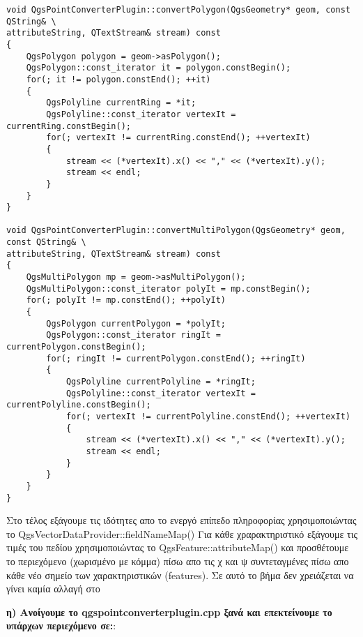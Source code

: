 \begin{verbatim}
void QgsPointConverterPlugin::convertPolygon(QgsGeometry* geom, const QString& \
attributeString, QTextStream& stream) const
{
    QgsPolygon polygon = geom->asPolygon();
    QgsPolygon::const_iterator it = polygon.constBegin();
    for(; it != polygon.constEnd(); ++it)
    {
        QgsPolyline currentRing = *it;
        QgsPolyline::const_iterator vertexIt = currentRing.constBegin();
        for(; vertexIt != currentRing.constEnd(); ++vertexIt)
        {
            stream << (*vertexIt).x() << "," << (*vertexIt).y();
            stream << endl;
        }
    }
}

void QgsPointConverterPlugin::convertMultiPolygon(QgsGeometry* geom, const QString& \
attributeString, QTextStream& stream) const
{
    QgsMultiPolygon mp = geom->asMultiPolygon();
    QgsMultiPolygon::const_iterator polyIt = mp.constBegin();
    for(; polyIt != mp.constEnd(); ++polyIt)
    {
        QgsPolygon currentPolygon = *polyIt;
        QgsPolygon::const_iterator ringIt = currentPolygon.constBegin();
        for(; ringIt != currentPolygon.constEnd(); ++ringIt)
        {
            QgsPolyline currentPolyline = *ringIt;
            QgsPolyline::const_iterator vertexIt = currentPolyline.constBegin();
            for(; vertexIt != currentPolyline.constEnd(); ++vertexIt)
            {
                stream << (*vertexIt).x() << "," << (*vertexIt).y();
                stream << endl;
            }
        }
    }
}
\end{verbatim}


Στο τέλος εξάγουμε τις ιδότητες απο το ενεργό επίπεδο πληροφορίας χρησιμοποιώντας το QgsVectorDataProvider::fieldNameMap() Για κάθε χραρακτηριστικό εξάγουμε τις τιμές του πεδίου χρησιμοποιώντας το QgsFeature::attributeMap() και προσθέτουμε το περιεχόμενο (χωρισμένο με κόμμα) πίσω απο τις χ και ψ συντεταγμένες πίσω απο κάθε νέο σημείο των χαρακτηριστικών (features). Σε αυτό το βήμα δεν χρειάζεται να γίνει καμία αλλαγή στο 

\textbf{η) Ανοίγουμε το qgspointconverterplugin.cpp ξανά και επεκτείνουμε το υπάρχων περιεχόμενο σε:}:

